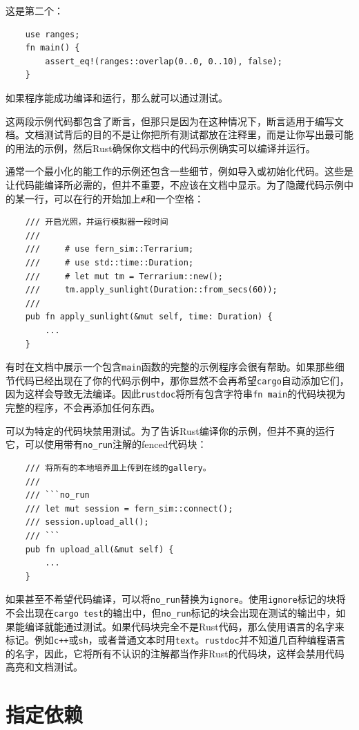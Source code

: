 这是第二个：
\begin{verbatim}
    use ranges;
    fn main() {
        assert_eq!(ranges::overlap(0..0, 0..10), false);
    }
\end{verbatim}
如果程序能成功编译和运行，那么就可以通过测试。

这两段示例代码都包含了断言，但那只是因为在这种情况下，断言适用于编写文档。文档测试背后的目的不是让你把所有测试都放在注释里，而是让你写出最可能的用法的示例，然后Rust确保你文档中的代码示例确实可以编译并运行。

通常一个最小化的能工作的示例还包含一些细节，例如导入或初始化代码。这些是让代码能编译所必需的，但并不重要，不应该在文档中显示。为了隐藏代码示例中的某一行，可以在行的开始加上\texttt{\#}和一个空格：
\begin{verbatim}
    /// 开启光照，并运行模拟器一段时间
    ///
    ///     # use fern_sim::Terrarium;
    ///     # use std::time::Duration;
    ///     # let mut tm = Terrarium::new();
    ///     tm.apply_sunlight(Duration::from_secs(60));
    ///
    pub fn apply_sunlight(&mut self, time: Duration) {
        ...
    }
\end{verbatim}

有时在文档中展示一个包含\texttt{main}函数的完整的示例程序会很有帮助。如果那些细节代码已经出现在了你的代码示例中，那你显然不会再希望\texttt{cargo}自动添加它们，因为这样会导致无法编译。因此\texttt{rustdoc}将所有包含字符串\texttt{fn main}的代码块视为完整的程序，不会再添加任何东西。

可以为特定的代码块禁用测试。为了告诉Rust编译你的示例，但并不真的运行它，可以使用带有\texttt{no\_run}注解的fenced代码块：
\begin{verbatim}
    /// 将所有的本地培养皿上传到在线的gallery。
    ///
    /// ```no_run
    /// let mut session = fern_sim::connect();
    /// session.upload_all();
    /// ```
    pub fn upload_all(&mut self) {
        ...
    }
\end{verbatim}

如果甚至不希望代码编译，可以将\texttt{no\_run}替换为\texttt{ignore}。使用\texttt{ignore}标记的块将不会出现在\texttt{cargo test}的输出中，但\texttt{no\_run}标记的块会出现在测试的输出中，如果能编译就能通过测试。如果代码块完全不是Rust代码，那么使用语言的名字来标记。例如\texttt{c++}或\texttt{sh}，或者普通文本时用\texttt{text}。\texttt{rustdoc}并不知道几百种编程语言的名字，因此，它将所有不认识的注解都当作非Rust的代码块，这样会禁用代码高亮和文档测试。

\section{指定依赖}

